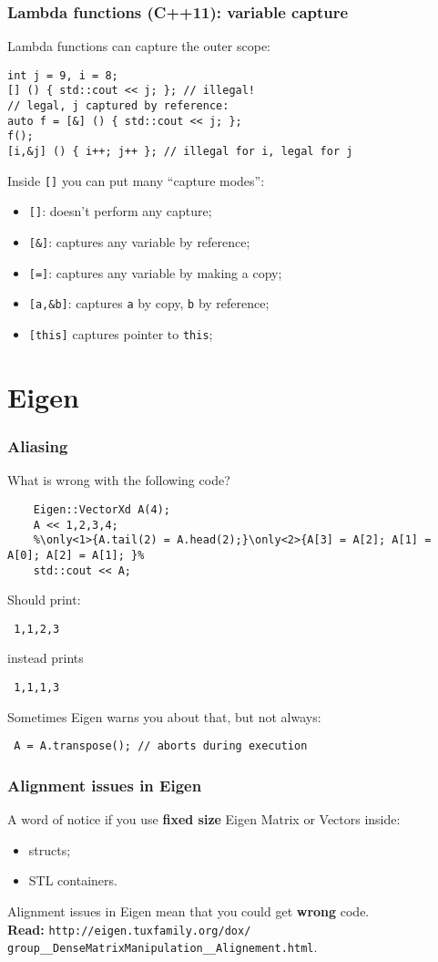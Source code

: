 \documentclass{beamer}
\newcommand{\code}[1]{{\color{cgreen}\texttt{#1}}}
\begin{document}
\begin{frame}[fragile]
\frametitle{Lambda functions (C++11): variable capture}
 Lambda functions can capture the outer scope:
 \begin{lstlisting}
int j = 9, i = 8;
[] () { std::cout << j; }; // illegal!
// legal, j captured by reference:
auto f = [&] () { std::cout << j; };
f();
[i,&j] () { i++; j++ }; // illegal for i, legal for j
 \end{lstlisting}
 Inside \code{[]} you can put many ``capture modes'':
 \begin{itemize}
  \item \code{[]}: doesn't perform any capture;
  \item \code{[\&]}: captures any variable by reference;
  \item \code{[=]}: captures any variable by making a copy;
  \item \code{[a,\&b]}: captures \code{a} by copy, \code{b} by reference;
  \item \code{[this]} captures pointer to \code{this};
 \end{itemize}
\end{frame}
 
\section{Eigen}

\begin{frame}[fragile]
\frametitle{Aliasing}

What is wrong with the following code?
\begin{lstlisting}
    Eigen::VectorXd A(4);
    A << 1,2,3,4;
    %\only<1>{A.tail(2) = A.head(2);}\only<2>{A[3] = A[2]; A[1] = A[0]; A[2] = A[1]; }%
    std::cout << A;
\end{lstlisting}
Should print:
\begin{verbatim}
 1,1,2,3
\end{verbatim}
instead prints
\begin{verbatim}
 1,1,1,3
\end{verbatim}
Sometimes Eigen warns you about that, but not always:
\begin{lstlisting}
 A = A.transpose(); // aborts during execution
\end{lstlisting}
\end{frame}

\begin{frame}[fragile]
\frametitle{Alignment issues in Eigen}
 A word of notice if you use \textbf{fixed size} Eigen Matrix or Vectors inside:
 \begin{itemize}
  \item structs;
  \item STL containers.
 \end{itemize}
 Alignment issues in Eigen mean that you could get \textbf{wrong} code. \\
 \textbf{Read:} \verb|http://eigen.tuxfamily.org/dox/|
 \verb|group__DenseMatrixManipulation__Alignement.html|.
\end{frame}
\end{document}
